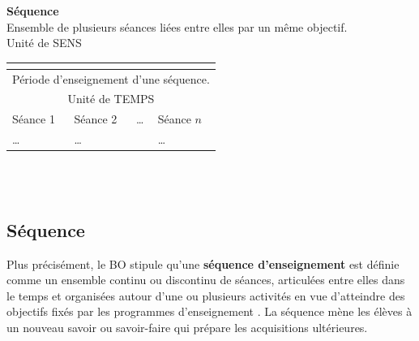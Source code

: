 \begin{center}
   \begin{ltableau}{0.65\linewidth}{1}
      \hline
      {\bf Séquence} \\
      \hline
      Ensemble de plusieurs séances liées entre elles par un même objectif. \\
      Unité de SENS \\ [1mm] 
      \begin{tabular}{|p{2cm}|p{2cm}|p{2cm}|p{2cm}|} 
         \hline
         \multicolumn{4}{|c|}{\cellcolor{FondTableaux}{\bf Séances}} \\
         \hline
         \multicolumn{4}{|c|}{Période d'enseignement d'une séquence.} \\
         \multicolumn{4}{|c|}{Unité de TEMPS}\\
         \hline
        Séance 1 & Séance 2 & \dots & Séance $n$ \\
         \hline
         \dots & \dots & & \dots \\ [8mm] 
         \hline
      \end{tabular} \\
      \\ [-3mm]
      \hline
   \end{ltableau}
\end{center}


\subsection{Séquence} %

Plus précisément, le BO stipule qu'une {\bf séquence d'enseignement }est définie comme \og un ensemble continu ou discontinu de séances, articulées entre elles dans le temps et organisées autour d'une ou plusieurs activités en vue d'atteindre des objectifs fixés par les programmes d'enseignement \fg. La séquence mène les élèves à un nouveau savoir ou savoir-faire qui prépare les acquisitions ultérieures. \medskip

